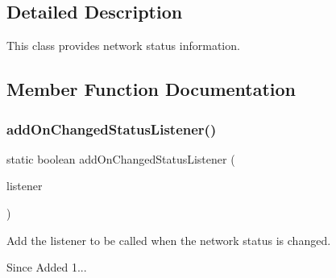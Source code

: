 \subsection{Detailed Description}
This class provides network status information. 

\subsection{Member Function Documentation}
\mbox{\label{classcom_1_1toast_1_1android_1_1gamebase_1_1_gamebase_1_1_network_a787c04bc186b6be1c1edab693496a6cd}} 
\subsubsection{\texorpdfstring{add\+On\+Changed\+Status\+Listener()}{addOnChangedStatusListener()}}
{\footnotesize\ttfamily static boolean add\+On\+Changed\+Status\+Listener (\begin{DoxyParamCaption}\item[{final Network\+Manager.\+On\+Changed\+Status\+Listener}]{listener }\end{DoxyParamCaption})\hspace{0.3cm}{\ttfamily [static]}}



Add the listener to be called when the network status is changed. 

\begin{DoxySince}{Since}
Added 1... 
\end{DoxySince}

